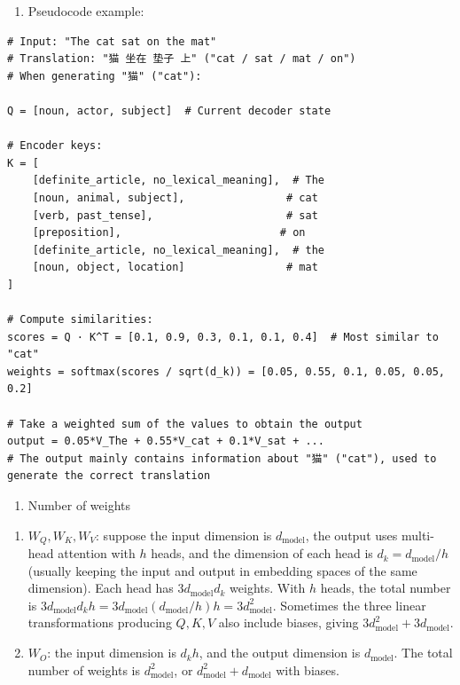 \begin{enumerate}
\def\labelenumi{\arabic{enumi}.}
\setcounter{enumi}{4}
\tightlist
\item
{}
  Pseudocode example:
\end{enumerate}

\begin{verbatim}
# Input: "The cat sat on the mat"
# Translation: "猫 坐在 垫子 上" ("cat / sat / mat / on")
# When generating "猫" ("cat"):

Q = [noun, actor, subject]  # Current decoder state

# Encoder keys:
K = [
    [definite_article, no_lexical_meaning],  # The
    [noun, animal, subject],                # cat
    [verb, past_tense],                     # sat
    [preposition],                         # on
    [definite_article, no_lexical_meaning],  # the
    [noun, object, location]                # mat
]

# Compute similarities:
scores = Q · K^T = [0.1, 0.9, 0.3, 0.1, 0.1, 0.4]  # Most similar to "cat"
weights = softmax(scores / sqrt(d_k)) = [0.05, 0.55, 0.1, 0.05, 0.05, 0.2]

# Take a weighted sum of the values to obtain the output
output = 0.05*V_The + 0.55*V_cat + 0.1*V_sat + ...
# The output mainly contains information about "猫" ("cat"), used to generate the correct translation
\end{verbatim}

\begin{enumerate}
\def\labelenumi{\arabic{enumi}.}
\setcounter{enumi}{5}
\tightlist
\item
  Number of weights
\end{enumerate}

\begin{enumerate}
\def\labelenumi{(\arabic{enumi})}
\item
  \(W_Q,W_K,W_V\): suppose the input dimension is \(d_{\mathrm{model}}\), the output uses multi-head attention with \(h\) heads, and the dimension of each head is \(d_k=d_{\mathrm{model}}/h\) (usually keeping the input and output in embedding spaces of the same dimension). Each head has \(3d_{\mathrm{model}}d_k\) weights. With \(h\) heads, the total number is \(3d_{\mathrm{model}}d_kh=3d_{\mathrm{model}}(d_{\mathrm{model}}/h)h=3d_{\mathrm{model}}^2\). Sometimes the three linear transformations producing \(Q,K,V\) also include biases, giving \(3d_{\mathrm{model}}^2+3d_{\mathrm{model}}\).
\item
  \(W_O\): the input dimension is \(d_kh\), and the output dimension is \(d_{\mathrm{model}}\). The total number of weights is \(d_{\mathrm{model}}^2\), or \(d_{\mathrm{model}}^2+d_{\mathrm{model}}\) with biases.
\end{enumerate}


